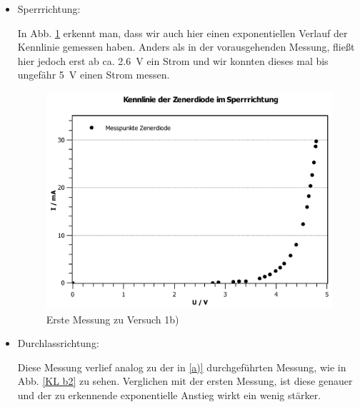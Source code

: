 \documentclass[11pt,a4paper,titlepage, ngerman]{article}
\begin{document}
				 \begin{itemize}
				 	
				 	\item Sperrrichtung: 
				 	
				 	In Abb. \ref{KL b1} erkennt man, dass wir auch hier einen exponentiellen Verlauf der Kennlinie gemessen haben. 				 	
				 	Anders als in der vorausgehenden Messung, fließt hier jedoch erst ab ca. \SI{2.6}{\V} ein Strom und wir konnten dieses mal bis ungefähr \SI{5}{\V} einen Strom messen.
				 	
				 	\begin{figure}
				 		\centering
				 		\includegraphics[width=\textwidth]{KennlinieZenerdiodeSperrrichtung.pdf}
				 		\caption{Erste Messung zu Versuch 1b)}
				 		\label{KL b1}
				 	\end{figure}
				 	
				 	\item Durchlassrichtung:  
				 	
				 	Diese Messung verlief analog zu der in \ref{a)} durchgeführten Messung, wie in Abb. \ref{KL b2} zu sehen. Verglichen mit der ersten Messung, ist diese genauer und der zu erkennende exponentielle Anstieg wirkt ein wenig stärker.
				 	

\end{itemize}
\end{document}
